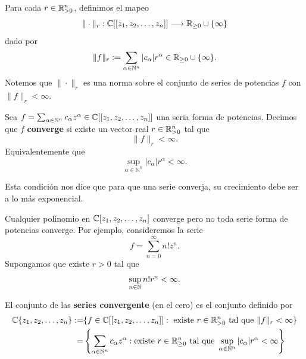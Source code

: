 Para cada $r\in\mathbb{R}_{>0}^n$, definimos el mapeo
	\begin{equation*}
		\|\cdot\|_r:\mathbb{C}[[z_1,z_2,\dots,z_n]]\longrightarrow \mathbb{R}_{\geq 0}\cup\{\infty\}
	\end{equation*}
dado por
\begin{equation*}
	\|f\|_r:=\sum_{\alpha\in\mathbb{N}^n} |c_\alpha|r^\alpha\in\mathbb{R}_{\geq 0}\cup\{\infty\}.
\end{equation*}
Notemos que $\|\cdot\|_r$ es una norma sobre el conjunto de series de potencias $f$ con $\|f\|_r<\infty$.

\begin{definition}
	Sea $f=\sum_{\alpha\in\mathbb{N}^{n}}c_\alpha z^{\alpha}\in \mathbb{C}[[z_1,z_2,\dots,z_n]]$ una seria forma de potencias. Decimos que $f$ \textbf{converge} si existe un vector real $r\in \mathbb{R}_{>0}^n$ tal que
		\begin{equation*}
			\|f\|_r<\infty.
		\end{equation*}
	Equivalentemente que
	\begin{equation*}
		\sup_{\alpha\in\mathbb{N}^{n}}|c_\alpha|r^\alpha<\infty.
	\end{equation*} 
\end{definition}

Esta condición nos dice que para que una serie converja, su crecimiento debe ser a lo más exponencial.

\begin{example}
	Cualquier polinomio en $\mathbb{C}[z_1,z_2,\dots,z_n]$ converge pero no toda serie forma de potencias converge. Por ejemplo, consideremos la serie
	\begin{equation*}
		f=\sum_{n=0}^{\infty} n!z^n.
	\end{equation*} 
	Supongamos que existe $r>0$ tal que
	\begin{equation*}
		\sup_{n\in\mathbb{N}}n!r^n<\infty.
	\end{equation*}
	
\end{example}
\begin{definition}
    El conjunto de las \textbf{series convergente} (en el cero) es el conjunto definido por
    \begin{align*}
    	\mathbb{C}\{z_1,z_2,\dots,z_n\}:=&\{f\in\mathbb{C}[[z_1,z_2,\dots,z_n]]:\text{ existe }r\in \mathbb{R}_{>0}^n\text{ tal que }\|f\|_r<\infty\}\\
    	=&\left\{\sum_{\alpha\in\mathbb{N}^{n}}c_\alpha z^{\alpha}:\text{existe }r\in\mathbb{R}^n_{\geq 0}\text{ tal que }\sup_{\alpha\in\mathbb{N}^{n}}|c_\alpha| r^{\alpha}<\infty \right\}
    \end{align*}
\end{definition}

